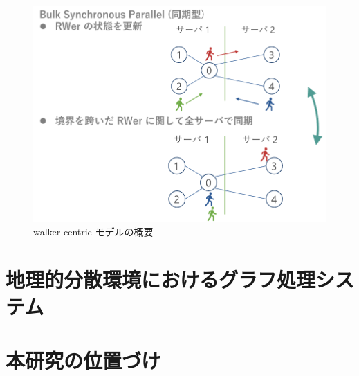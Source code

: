\begin{figure}[t]
    \centering
    \includegraphics[scale=0.7]{figure/walkercentric.pdf}
    \caption{walker centric モデルの概要}
    \label{walker centric モデルの概要}
\end{figure}

\section{地理的分散環境におけるグラフ処理システム}

\section{本研究の位置づけ}